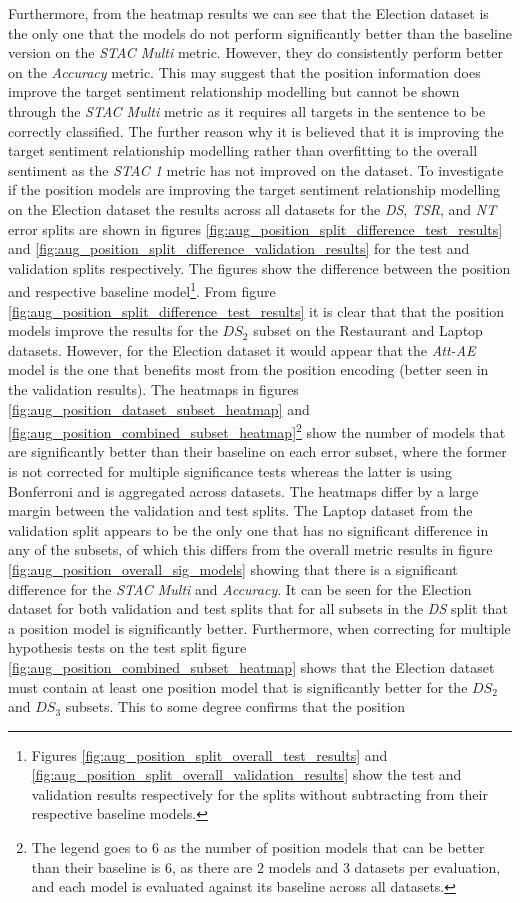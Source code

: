 Furthermore, from the heatmap results we can see that the Election dataset is the only one that the models do not perform significantly better than the baseline version on the \textit{STAC Multi} metric. However, they do consistently perform better on the \textit{Accuracy} metric. This may suggest that the position information does improve the target sentiment relationship modelling but cannot be shown through the \textit{STAC Multi} metric as it requires all targets in the sentence to be correctly classified. The further reason why it is believed that it is improving the target sentiment relationship modelling rather than overfitting to the overall sentiment as the \textit{STAC 1} metric has not improved on the dataset. To investigate if the position models are improving the target sentiment relationship modelling on the Election dataset the results across all datasets for the \textit{DS}, \textit{TSR}, and \textit{NT} error splits are shown in figures \ref{fig:aug_position_split_difference_test_results} and \ref{fig:aug_position_split_difference_validation_results} for the test and validation splits respectively. The figures show the difference between the position and respective baseline model\footnote{Figures \ref{fig:aug_position_split_overall_test_results} and \ref{fig:aug_position_split_overall_validation_results} show the test and validation results respectively for the splits without subtracting from their respective baseline models.}. From figure \ref{fig:aug_position_split_difference_test_results} it is clear that that the position models improve the results for the $DS_2$ subset on the Restaurant and Laptop datasets. However, for the Election dataset it would appear that the \textit{Att-AE} model is the one that benefits most from the position encoding (better seen in the validation results). The heatmaps in figures \ref{fig:aug_position_dataset_subset_heatmap} and \ref{fig:aug_position_combined_subset_heatmap}\footnote{The legend goes to $6$ as the number of position models that can be better than their baseline is $6$, as there are $2$ models and $3$ datasets per evaluation, and each model is evaluated against its baseline across all datasets.} show the number of models that are significantly better than their baseline on each error subset, where the former is not corrected for multiple significance tests whereas the latter is using Bonferroni and is aggregated across datasets. The heatmaps differ by a large margin between the validation and test splits. The Laptop dataset from the validation split appears to be the only one that has no significant difference in any of the subsets, of which this differs from the overall metric results in figure \ref{fig:aug_position_overall_sig_models} showing that there is a significant difference for the \textit{STAC Multi} and \textit{Accuracy}. It can be seen for the Election dataset for both validation and test splits that for all subsets in the \textit{DS} split that a position model is significantly better. Furthermore, when correcting for multiple hypothesis tests on the test split figure \ref{fig:aug_position_combined_subset_heatmap} shows that the Election dataset must contain at least one position model that is significantly better for the $DS_2$ and $DS_3$ subsets. This to some degree confirms that the position 